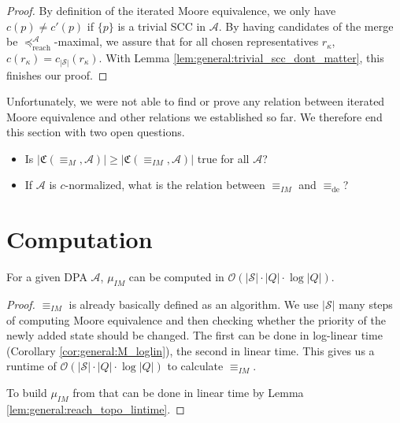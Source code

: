 \begin{proof}
	By definition of the iterated Moore equivalence, we only have $c(p) \neq c'(p)$ if $\{p\}$ is a trivial SCC in $\mathcal{A}$. By having candidates of the merge be $\preceq_\text{reach}^\mathcal{A}$-maximal, we assure that for all chosen representatives $r_\kappa$, $c(r_\kappa) = c_{|\mathcal{S}|}(r_\kappa)$. With Lemma \ref{lem:general:trivial_scc_dont_matter}, this finishes our proof.
\end{proof}

\vspace{10pt}

Unfortunately, we were not able to find or prove any relation between iterated Moore equivalence and other relations we established so far. We therefore end this section with two open questions.

\begin{itemize}
	\item Is $|\mathfrak{C}(\equiv_M, \mathcal{A})| \geq |\mathfrak{C}(\equiv_{IM}, \mathcal{A})|$ true for all $\mathcal{A}$?
	\item If $\mathcal{A}$ is $c$-normalized, what is the relation between $\equiv_{IM}$ and $\equiv_\text{de}$?
\end{itemize}


\section{Computation}
\begin{lem}
	For a given DPA $\mathcal{A}$, $\mu_{IM}$ can be computed in $\mathcal{O}(|\mathcal{S}| \cdot |Q| \cdot \log |Q|)$.
\end{lem}

\begin{proof}
	$\equiv_{IM}$ is already basically defined as an algorithm. We use $|\mathcal{S}|$ many steps of computing Moore equivalence and then checking whether the priority of the newly added state should be changed. The first can be done in log-linear time (Corollary \ref{cor:general:M_loglin}), the second in linear time. This gives us a runtime of $\mathcal{O}(|\mathcal{S}| \cdot |Q| \cdot \log |Q|)$ to calculate $\equiv_{IM}$.

	To build $\mu_{IM}$ from that can be done in linear time by Lemma \ref{lem:general:reach_topo_lintime}.
\end{proof}


